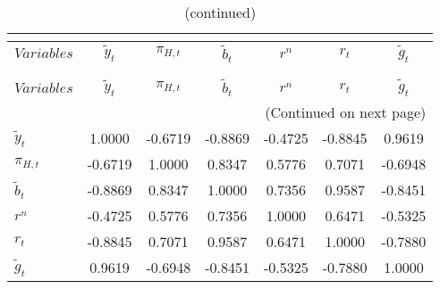  
\begin{center}
\begin{longtable}{lcccccc} 
\caption{MATRIX OF CORRELATIONS}\\
 \label{Table:th_corr_matrix}\\
\toprule 
$Variables        $	 & 	 $   {\tilde{y}_{t}}$	 & 	 $       {\pi_{H,t}}$	 & 	 $     \tilde{b}_{t}$	 & 	 $            {r^{n}}$	 & 	 $            {r_{t}}$	 & 	 $     \tilde{g}_{t}$\\
\midrule \endfirsthead 
\caption{(continued)}\\
 \toprule \\ 
$Variables        $	 & 	 $   {\tilde{y}_{t}}$	 & 	 $       {\pi_{H,t}}$	 & 	 $     \tilde{b}_{t}$	 & 	 $            {r^{n}}$	 & 	 $            {r_{t}}$	 & 	 $     \tilde{g}_{t}$\\
\midrule \endhead 
\midrule \multicolumn{7}{r}{(Continued on next page)} \\ \bottomrule \endfoot 
\bottomrule \endlastfoot 
${\tilde{y}_{t}}  $	 & 	             1.0000	 & 	            -0.6719	 & 	            -0.8869	 & 	            -0.4725	 & 	            -0.8845	 & 	             0.9619 \\ 
${\pi_{H,t}}      $	 & 	            -0.6719	 & 	             1.0000	 & 	             0.8347	 & 	             0.5776	 & 	             0.7071	 & 	            -0.6948 \\ 
$\tilde{b}_{t}    $	 & 	            -0.8869	 & 	             0.8347	 & 	             1.0000	 & 	             0.7356	 & 	             0.9587	 & 	            -0.8451 \\ 
${r^{n}}          $	 & 	            -0.4725	 & 	             0.5776	 & 	             0.7356	 & 	             1.0000	 & 	             0.6471	 & 	            -0.5325 \\ 
${r_{t}}          $	 & 	            -0.8845	 & 	             0.7071	 & 	             0.9587	 & 	             0.6471	 & 	             1.0000	 & 	            -0.7880 \\ 
$\tilde{g}_{t}    $	 & 	             0.9619	 & 	            -0.6948	 & 	            -0.8451	 & 	            -0.5325	 & 	            -0.7880	 & 	             1.0000 \\ 
\end{longtable}
 \end{center}
